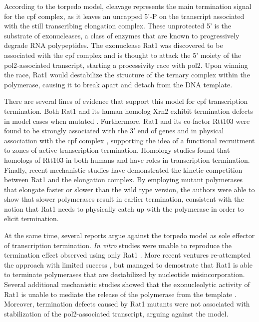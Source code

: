 According to the torpedo model, cleavage represents the main termination signal for the \gls{cpf} complex, as it leaves an uncapped 5'-P on the transcript associated with the still transcribing elongation complex.
These unprotected 5' is the substrate of \FtoT{} exonucleases, a class of enzymes that are known to progressively degrade RNA polypeptides.
The \FtoT{} exonuclease Rat1 was discovered to be associated with the \gls{cpf} complex and is thought to attack the 5' moiety of the \gls{pol2}-associated transcript, starting a processivity race with \gls{pol2}.
Upon winning the race, Rat1 would destabilize the structure of the ternary complex within the polymerase, causing it to break apart and detach from the DNA template.

There are several lines of evidence that support this model for \gls{cpf} transcription termination.
Both Rat1 and its human homolog Xrn2 exhibit termination defects in model cases when mutated \citep{kim:2004:yeast, west:2004:human}.
Furthermore, Rat1 and its co-factor Rtt103 were found to be strongly associated with the 3' end of genes and in physical association with the \gls{cpf} complex \citep{kim:2004:yeast,luo:2006:role}, supporting the idea of a functional recruitment to zones of active transcription termination.
Homology studies found that homologs of Rtt103 in both humans and \cele{} have roles in transcription termination\citep{morales:2014:kub5hera, cui:2008:genes}.
Finally, recent mechanistic studies \invivo{} have demonstrated the kinetic competition between Rat1 and the elongation complex. By employing mutant polymerases that elongate faster or slower than the wild type version, the authors were able to show that slower polymerases result in earlier termination, consistent with the notion that Rat1 needs to physically catch up with the polymerase in order to elicit termination\citep{fong:2015:effects}.

At the same time, several reports argue against the torpedo model as sole effector of transcription termination.
\emph{In vitro} studies were unable to reproduce the termination effect observed \invivo{} using only Rat1 \citep{dengl:2009:torpedo}. More recent ventures re-attempted the \invitro{} approach with limited success \citep{park:2015:unraveling}, but managed to demostrate that Rat1 is able to terminate polymerases that are destabilized by nucleotide misincorporation.
Several additional mechanistic studies showed that the exonucleolytic activity of Rat1 is unable to mediate the release of the polymerase from the template \citep{luo:2006:role, pearson:2013:dismantling}.
Moreover, termination defects caused by Rat1 mutants were not associated with stabilization of the \gls{pol2}-associated transcript, arguing against the model.



